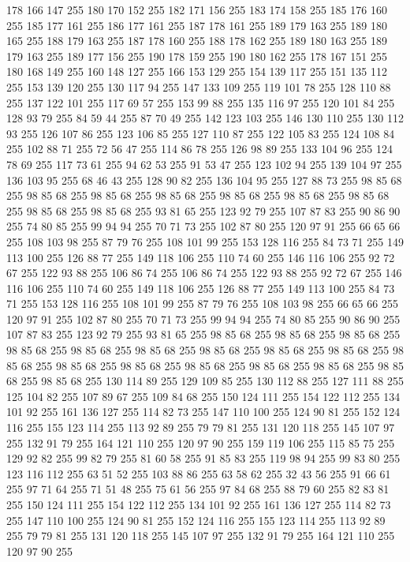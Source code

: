 178 166 147 255 180 170 152 255 182 171 156 255 183 174 158 255 185 176 160 255 185 177 161 255 186 177 161 255 187 178 161 255 189 179 163 255 189 180 165 255 188 179 163 255 187 178 160 255 188 178 162 255 189 180 163 255 189 179 163 255 189 177 156 255 190 178 159 255 190 180 162 255 178 167 151 255 180 168 149 255 160 148 127 255 166 153 129 255 154 139 117 255 151 135 112 255 153 139 120 255 130 117 94 255 147 133 109 255 119 101 78 255 128 110 88 255 137 122 101 255 117 69 57 255 153 99 88 255 135 116 97 255 120 101 84 255 128 93 79 255 84 59 44 255 87 70 49 255 142 123 103 255 146 130 110 255 130 112 93 255 126 107 86 255 123 106 85 255 127 110 87 255 122 105 83 255 124 108 84 255 102 88 71 255 72 56 47 255 114 86 78 255 126 98 89 255 133 104 96 255 124 78 69 255 117 73 61 255 94 62 53 255 91 53 47 255 123 102 94 255 139 104 97 255 136 103 95 255 68 46 43 255 128 90 82 255 136 104 95 255 127 88 73 255 98 85 68 255 98 85 68 255 98 85 68 255
98 85 68 255 98 85 68 255 98 85 68 255 98 85 68 255 98 85 68 255 98 85 68 255 93 81 65 255 123 92 79 255 107 87 83 255 90 86 90 255 74 80 85 255 99 94 94 255 70 71 73 255 102 87 80 255 120 97 91 255 66 65 66 255 108 103 98 255 87 79 76 255 108 101 99 255 153 128 116 255 84 73 71 255 149 113 100 255 126 88 77 255 149 118 106 255 110 74 60 255 146 116 106 255 92 72 67 255 122 93 88 255 106 86 74 255 106 86 74 255 122 93 88 255 92 72 67 255 146 116 106 255 110 74 60 255 149 118 106 255 126 88 77 255 149 113 100 255 84 73 71 255 153 128 116 255 108 101 99 255 87 79 76 255 108 103 98 255 66 65 66 255 120 97 91 255 102 87 80 255 70 71 73 255 99 94 94 255 74 80 85 255 90 86 90 255 107 87 83 255 123 92 79 255 93 81 65 255 98 85 68 255 98 85 68 255 98 85 68 255 98 85 68 255 98 85 68 255 98 85 68 255 98 85 68 255 98 85 68 255 98 85 68 255 98 85 68 255 98 85 68 255 98 85 68 255
98 85 68 255 98 85 68 255 98 85 68 255 98 85 68 255 98 85 68 255 130 114 89 255 129 109 85 255 130 112 88 255 127 111 88 255 125 104 82 255 107 89 67 255 109 84 68 255 150 124 111 255 154 122 112 255 134 101 92 255 161 136 127 255 114 82 73 255 147 110 100 255 124 90 81 255 152 124 116 255 155 123 114 255 113 92 89 255 79 79 81 255 131 120 118 255 145 107 97 255 132 91 79 255 164 121 110 255 120 97 90 255 159 119 106 255 115 85 75 255 129 92 82 255 99 82 79 255 81 60 58 255 91 85 83 255 119 98 94 255 99 83 80 255 123 116 112 255 63 51 52 255 103 88 86 255 63 58 62 255 32 43 56 255 91 66 61 255 97 71 64 255 71 51 48 255 75 61 56 255 97 84 68 255 88 79 60 255 82 83 81 255 150 124 111 255 154 122 112 255 134 101 92 255 161 136 127 255 114 82 73 255 147 110 100 255 124 90 81 255 152 124 116 255 155 123 114 255 113 92 89 255 79 79 81 255 131 120 118 255 145 107 97 255 132 91 79 255 164 121 110 255 120 97 90 255
